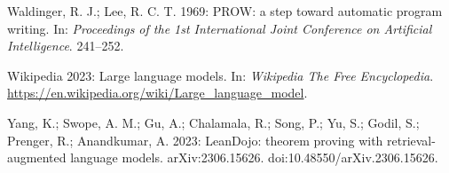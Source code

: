 \documentclass[runningheads]{llncs}
\begin{document}
\begin{thebibliography}{apalike}
\citep{wal:lee}
Waldinger, R. J.; Lee, R. C. T.  1969: PROW: a step toward automatic program writing. In: \emph{Proceedings of the 1st International Joint Conference on Artificial Intelligence}. 241–252.

\citep{wik:llm}
Wikipedia 2023: Large language models. In: \emph{Wikipedia The Free Encyclopedia}.  \url{https://en.wikipedia.org/wiki/Large\_language\_model}. 

\citep{leandojo}
Yang, K.; Swope, A. M.; Gu, A.;  Chalamala, R.; Song, P.; Yu, S.; Godil, S.; Prenger,  R.; Anandkumar, A. 2023: LeanDojo: theorem proving with retrieval-augmented language models.
arXiv:2306.15626. doi:10.48550/arXiv.2306.15626.


\end{thebibliography}
\end{document}
